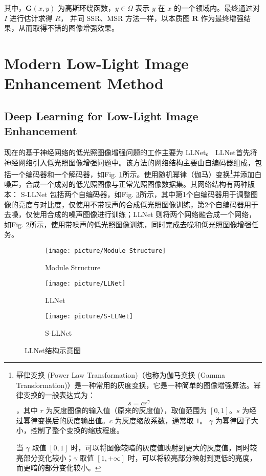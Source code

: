 \documentclass[letterpaper,10pt]{article}
\begin{document}
		其中，$\mathbf{G}(x,y)$ 为高斯环绕函数，$y \in \Omega$ 表示 $y$ 在 $x$ 的一个领域内。最终通过对 $I$ 进行估计求得 $R$， 并同 SSR、MSR 方法一样，以本质图 $\mathbf{R}$ 作为最终增强结果，从而取得不错的图像增强效果。 
	\section{Modern Low-Light Image Enhancement Method}
		
		\subsection{Deep Learning for Low-Light Image Enhancement}
		
		现在的基于神经网络的低光照图像增强问题的工作主要为 LLNet。
		LLNet\cite{lore2016llnet}首先将神经网络引入低光照图像增强问题中。该方法的网络结构主要由自编码器组成，包括一个编码器和一个解码器，如Fig. \ref{fig: Module Structure}所示。使用随机幂律（伽马）变换\footnote{幂律变换 (Power Law Transformation)（也称为伽马变换 (Gamma Transformation)）是一种常用的灰度变换，它是一种简单的图像增强算法。幂律变换的一般表达式为：$$s = cr^\gamma$$，其中 $r$ 为灰度图像的输入值（原来的灰度值），取值范围为 $[0,1]$。$s$ 为经过幂律变换后的灰度输出值。$c$ 为灰度缩放系数，通常取 $1$。 $\gamma$ 为幂律因子大小，控制了整个变换的缩放程度。
		
		当 $\gamma$ 取值 $[0,1]$ 时，可以将图像较暗的灰度值映射到更大的灰度值，同时较亮部分变化较小；$\gamma$ 取值 $[1, + \infty]$ 时，可以将较亮部分映射到更低的亮度，而更暗的部分变化较小。}并添加白噪声，合成一个成对的低光照图像与正常光照图像数据集。其网络结构有两种版本： S-LLNet 包括两个自编码器，如Fig. \ref{fig: S-LLNet}所示，其中第1个自编码器用于调整图像的亮度与对比度，仅使用不带噪声的合成低光照图像训练，第2个自编码器用于去噪，仅使用合成的噪声图像进行训练；LLNet 则将两个网络融合成一个网络，如Fig. \ref{fig: LLNet}所示，使用带噪声的低光照图像训练，同时完成去噪和低光照图像增强任务。
		
		 \begin{figure}[htbp] 
		 	\centering 
		 	
		 	\begin{subfigure}{0.45\textwidth}
		 		\texttt{[image: picture/Module Structure]}
		 		\captionsetup{font=scriptsize}
		 		\caption{Module Structure}
		 		\label{fig: Module Structure}
		 	\end{subfigure}
		 	\begin{subfigure}{0.18\textwidth}
		 		\texttt{[image: picture/LLNet]}
		 		\captionsetup{font=scriptsize}
		 		\caption{LLNet}
		 		\label{fig: LLNet}
		 	\end{subfigure}
		 	\begin{subfigure}{0.175\textwidth}
		 		\texttt{[image: picture/S-LLNet]}
		 		\captionsetup{font=scriptsize}
		 		\caption{S-LLNet}
		 		\label{fig: S-LLNet}	
		 	\end{subfigure}
		 	\captionsetup{font=scriptsize}
		 	\caption{
		 		\label{fig: LLNet Architecture}
		 		LLNet结构示意图
		 	}
		 \end{figure}
		
\end{document}
